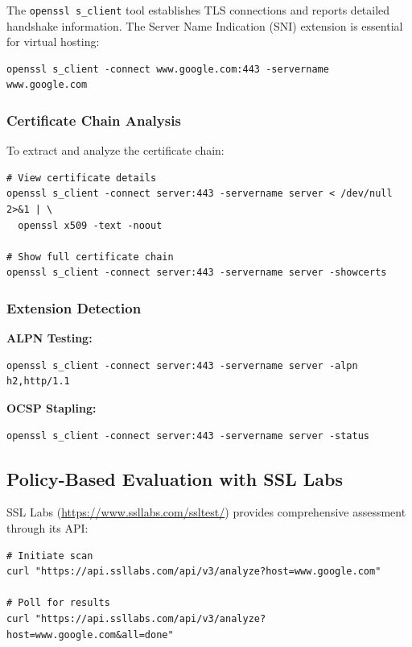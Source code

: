 \documentclass[12pt,a4paper]{article}
\begin{document}
The \texttt{openssl s\_client} tool establishes TLS connections and reports detailed handshake information. The Server Name Indication (SNI) extension is essential for virtual hosting:

\begin{lstlisting}[style=bashstyle, caption={Basic TLS connection test}]
openssl s_client -connect www.google.com:443 -servername www.google.com
\end{lstlisting}

\subsubsection{Certificate Chain Analysis}

To extract and analyze the certificate chain:

\begin{lstlisting}[style=bashstyle, caption={Certificate inspection}]
# View certificate details
openssl s_client -connect server:443 -servername server < /dev/null 2>&1 | \
  openssl x509 -text -noout

# Show full certificate chain
openssl s_client -connect server:443 -servername server -showcerts
\end{lstlisting}

\subsubsection{Extension Detection}

\textbf{ALPN Testing:}
\begin{lstlisting}[style=bashstyle]
openssl s_client -connect server:443 -servername server -alpn h2,http/1.1
\end{lstlisting}

\textbf{OCSP Stapling:}
\begin{lstlisting}[style=bashstyle]
openssl s_client -connect server:443 -servername server -status
\end{lstlisting}

\subsection{Policy-Based Evaluation with SSL Labs}

SSL Labs (\url{https://www.ssllabs.com/ssltest/}) provides comprehensive assessment through its API:

\begin{lstlisting}[style=bashstyle, caption={SSL Labs API workflow}]
# Initiate scan
curl "https://api.ssllabs.com/api/v3/analyze?host=www.google.com"

# Poll for results
curl "https://api.ssllabs.com/api/v3/analyze?host=www.google.com&all=done"
\end{lstlisting}
\end{document}

